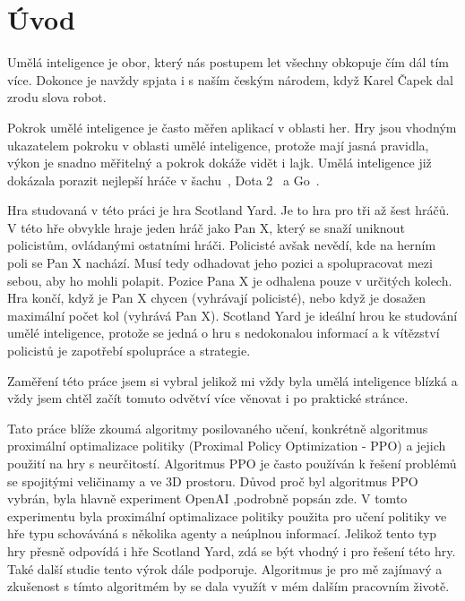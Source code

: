 
%

\newtheorem{definition}{\textbf{Definice}}

\chapter{Úvod}
\label{ch:uvod}

Umělá inteligence je obor, který nás postupem let všechny obkopuje čím dál tím více.
Dokonce je navždy spjata i s naším českým národem, když Karel Čapek dal zrodu slova robot.

Pokrok umělé inteligence je často měřen aplikací v oblasti her.
Hry jsou vhodným ukazatelem pokroku v oblasti umělé inteligence, protože mají jasná pravidla, výkon je snadno měřitelný a pokrok dokáže vidět i lajk.
Umělá inteligence již dokázala porazit nejlepší hráče v šachu~\cite{DeepBlue}, Dota 2~\cite{Dota2} a Go~\cite{AlphaGo}.

Hra studovaná v této práci je hra Scotland Yard.
Je to hra pro tři až šest hráčů.
V této hře obvykle hraje jeden hráč jako Pan X, který se snaží uniknout policistům, ovládanými ostatními hráči.
Policisté avšak nevědí, kde na herním poli se Pan X nachází.
Musí tedy odhadovat jeho pozici a spolupracovat mezi sebou, aby ho mohli polapit.
Pozice Pana X je odhalena pouze v určitých kolech.
Hra končí, když je Pan X chycen (vyhrávají policisté), nebo když je dosažen maximální počet kol (vyhrává Pan X).
Scotland Yard je ideální hrou ke studování umělé inteligence, protože se jedná o hru s nedokonalou informací a k vítězství policistů je zapotřebí spolupráce a strategie.

Zaměření této práce jsem si vybral jelikož mi vždy byla umělá inteligence blízká a vždy jsem chtěl začít tomuto odvětví více věnovat i po praktické stránce.

Tato práce blíže zkoumá algoritmy posilovaného učení, konkrétně algoritmus proximální optimalizace politiky (Proximal Policy Optimization - PPO) a jejich použití na hry s neurčitostí.
Algoritmus PPO je často používán k řešení problémů se spojitými veličinamy a ve 3D prostoru.
Důvod proč byl algoritmus PPO vybrán, byla hlavně experiment OpenAI \cite{PPO_Hide_Seek_page},podrobně popsán zde\cite{PPO_Hide_Seek_paper}.
V tomto experimentu byla proximální optimalizace politiky použita pro učení politiky ve hře typu schováváná s několika agenty a neúplnou informací.
Jelikož tento typ hry přesně odpovídá i hře Scotland Yard, zdá se být vhodný i pro řešení této hry.
Také další studie \cite{Manille} tento výrok dále podporuje.
Algoritmus je pro mě zajímavý a zkušenost s tímto algoritmém by se dala využít v mém dalším pracovním životě.

